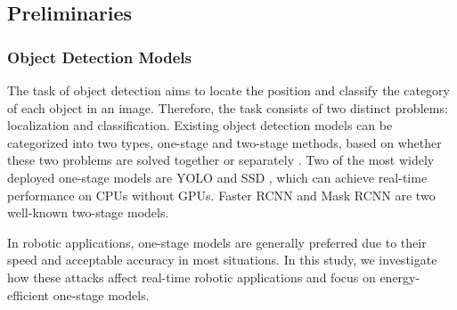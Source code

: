 
\subsection{Preliminaries}


\subsubsection{Object Detection Models}

The task of object detection aims to locate the position and classify the category of each object in an image. Therefore, the task consists of two distinct problems: localization and classification. Existing object detection models can be categorized into two types, one-stage and two-stage methods, based on whether these two problems are solved together or separately \citep{Zhao2019}. Two of the most widely deployed one-stage models are YOLO \citep{redmon2016you, redmon2018yolov3, bochkovskiy2020yolov4} and SSD \citep{liu2016ssd}, which can achieve real-time performance on CPUs without GPUs. Faster RCNN \citep{ren2015faster} and Mask RCNN \citep{he2017mask} are two well-known two-stage models. 



In robotic applications, one-stage models are generally preferred due to their speed and acceptable accuracy in most situations. In this study, we investigate how these attacks affect real-time robotic applications and focus on energy-efficient one-stage models.



